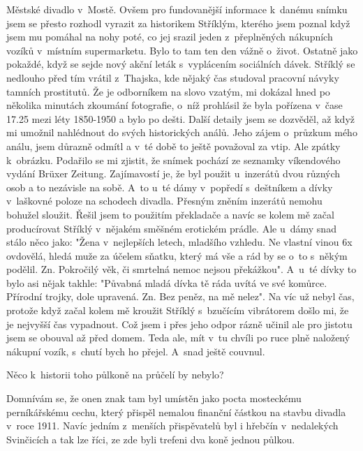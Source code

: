 
Městské divadlo v~Mostě. Ovšem pro fundovanější informace k~danému
snímku jsem se přesto rozhodl vyrazit za historikem Stříklým, kterého
jsem poznal když jsem mu pomáhal na nohy poté, co jej srazil jeden
z~přeplněných nákupních vozíků v~místním supermarketu. Bylo to tam ten
den vážně o~život. Ostatně jako pokaždé, když se sejde nový akční
leták s~vyplácením sociálních dávek. Stříklý se nedlouho před tím
vrátil z~Thajska, kde nějaký čas studoval pracovní návyky tamních
prostitutů. Že je odborníkem na slovo vzatým, mi dokázal hned po
několika minutách zkoumání fotografie, o~níž prohlásil že byla
pořízena v~čase 17.25 mezi léty 1850-1950 a bylo po dešti. Další
detaily jsem se dozvěděl, až když mi umožnil nahlédnout do svých
historických análů. Jeho zájem o~průzkum mého análu, jsem důrazně
odmítl a v~té době to ještě považoval za vtip. Ale zpátky k~obrázku.
Podařilo se mi zjistit, že snímek pochází ze seznamky víkendového
vydání Brüxer Zeitung. Zajímavostí je, že byl použit u~inzerátů dvou
různých osob a to nezávisle na sobě. A~to u~té dámy v~popředí
s~deštníkem a dívky v~laškovné poloze na schodech divadla. Přesným
zněním inzerátů nemohu bohužel sloužit. Řešil jsem to použitím
překladače a navíc se kolem mě začal producírovat Stříklý v~nějakém
směšném erotickém prádle. Ale u~dámy snad stálo něco jako: "Žena
v~nejlepších letech, mladšího vzhledu. Ne vlastní vinou 6x ovdovělá,
hledá muže za účelem sňatku, který má vše a rád by se o~to s~někým
podělil. Zn. Pokročilý věk, či smrtelná nemoc nejsou překážkou".
A~u~té dívky to bylo asi nějak takhle: "Půvabná mladá dívka tě ráda uvítá
ve své komůrce. Přírodní trojky, dole upravená. Zn. Bez peněz, na mě
nelez". Na víc už nebyl čas, protože když začal kolem mě kroužit
Stříklý s~bzučícím vibrátorem došlo mi, že je nejvyšší čas vypadnout.
Což jsem i přes jeho odpor rázně učinil ale pro jistotu jsem se
obouval až před domem. Teda ale, mít v~tu chvíli po ruce plně naložený
nákupní vozík, s~chutí bych ho přejel. A~snad ještě couvnul.

Něco k~historii toho půlkoně na průčelí by nebylo?

Domnívám se, že onen znak tam byl umístěn jako pocta mosteckému
perníkářskému cechu, který přispěl nemalou finanční částkou na stavbu
divadla v~roce 1911. Navíc jedním z~menších přispěvatelů byl i hřebčín
v~nedalekých Svinčicích a tak lze říci, ze zde byli trefeni dva koně
jednou půlkou.




